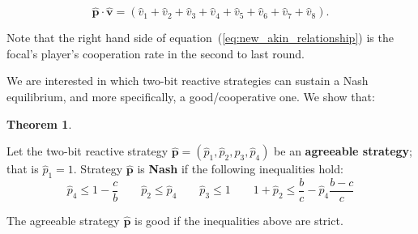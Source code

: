 \documentclass{article}
\theoremstyle{definition}
\newtheorem{theorem}{Theorem}[section]
\begin{document}
\begin{equation}\label{eq:new_akin_relationship}
  \mathbf{\hat{p}} \cdot \mathbf{\hat{v}} = (\hat{v}_1 + \hat{v}_2 + \hat{v}_3 + \hat{v}_4 + \hat{v}_5 + \hat{v}_6 + \hat{v}_7 + \hat{v}_8).
\end{equation}

Note that the right hand side of equation~(\ref{eq:new_akin_relationship}) is
the focal's player's cooperation rate in the second to last round.

We are interested in which two-bit reactive strategies can sustain a Nash
equilibrium, and more specifically, a good/cooperative one. We show that:

\begin{theorem}\label{theorem:two_bit_nash_and_good}

  Let the two-bit reactive strategy \(\mathbf{\hat{p}} = (\hat{p}_{1}, \hat{p}_{2}, \hat{p}_{3}, \hat{p}_{4})\) be an \textbf{agreeable
  strategy}; that is \(\hat{p}_1 = 1\). Strategy \(\mathbf{\hat{p}}\) is \textbf{Nash} if the
  following inequalities hold:
  \begin{equation*}
      \hat{p}_4 \leq 1 \!- \!\frac{c}{b} \qquad  \hat{p}_2  \leq \hat{p}_4 \qquad \hat{p}_3 \leq 1 \qquad 1 + \hat{p}_2 \leq \frac{b}{c} \!- \!\hat{p}_4 \frac{b\!-\!c}{c}
  \end{equation*}
  
  The agreeable strategy \(\mathbf{\hat{p}}\) is good if the inequalities above are strict.
  \end{theorem}
  
\end{document}
